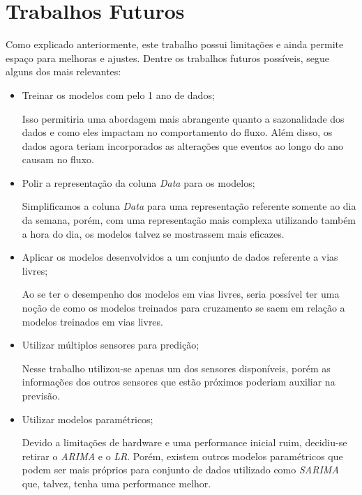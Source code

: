 \section{Trabalhos Futuros}

Como explicado anteriormente, este trabalho possui limitações e ainda permite espaço para melhoras e ajustes. Dentre os trabalhos futuros possíveis, segue alguns dos mais relevantes:

\begin{itemize}
    \item Treinar os modelos com pelo 1 ano de dados;
    
    Isso permitiria uma abordagem mais abrangente quanto a sazonalidade dos dados e como eles impactam no comportamento do fluxo. Além disso, os dados agora teriam incorporados as alterações que eventos ao longo do ano causam no fluxo.
    
    \item Polir a representação da coluna  \textit{Data} para os modelos;
    
    Simplificamos a coluna \textit{Data} para uma representação referente somente ao dia da semana, porém, com uma representação mais complexa utilizando também a hora do dia, os modelos talvez se mostrassem mais eficazes.
    \item Aplicar os modelos desenvolvidos a um conjunto de dados referente a vias livres;
    
    Ao se ter o desempenho dos modelos em vias livres, seria possível ter uma noção de como os modelos treinados para cruzamento se saem em relação a modelos treinados em vias livres.
    
    \item Utilizar múltiplos sensores para predição;
    
    Nesse trabalho utilizou-se apenas um dos sensores disponíveis, porém as informações dos outros sensores que estão próximos poderiam auxiliar na previsão.
    
    \item Utilizar modelos paramétricos;
    
    Devido a limitações de hardware e uma performance inicial ruim, decidiu-se retirar o \textit{\acrfull{ARIMA}} e o \textit{\acrfull{LR}}. Porém, existem outros modelos paramétricos que podem ser mais próprios para conjunto de dados utilizado como \textit{\acrfull{SARIMA}} que, talvez, tenha uma performance melhor.
    

\end{itemize}
